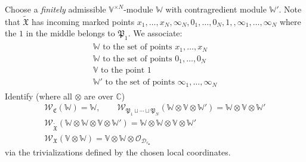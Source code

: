 \documentclass[11pt,b5paper,notitlepage]{article}
\theoremstyle{definition}
\theoremstyle{plain}
\newcommand{\fk}{\mathfrak}
\newcommand{\wtd}{\widetilde}
\newcommand{\blt}{\bullet}
\newcommand{\Vbb}{\mathbb V}
\newcommand{\Wbb}{\mathbb W}
\newcommand{\Cbb}{\mathbb C}
\newcommand{\<}{\left\langle}
\renewcommand{\>}{\right\rangle}
\newcommand{\MO}{\mathcal{O}}
\newcommand{\fx}{\mathfrak{X}}
\newcommand{\SW}{\mathscr{W}}
\newcommand{\MD}{\mathcal{D}}
\newcommand{\FC}{\mathfrak{C}}
\numberwithin{equation}{section}
\begin{document}
     
Choose a \emph{finitely} admissible $\Vbb^{\times N}$-module $\Wbb$ with contragredient module $\Wbb'$. Note that $\wtd{\fk X}$ has incoming marked points $x_1,\dots,x_N,\infty_N,0_1,\dots,0_N,1,,\infty_1,\dots,\infty_N$ where the  $1$ in the middle belongs to $\fk P_1$. We associate:
\begin{gather}
\begin{gathered}
\Wbb\text{ to the set of points }x_1,\dots,x_N\\
\Wbb\text{ to the set of points }0_1,\dots,0_N\\
\Vbb\text{ to the point }1\\
\Wbb'\text{ to the set of points }\infty_1,\dots,\infty_N
\end{gathered}
\end{gather}
Identify (where all $\otimes$ are over $\Cbb$)
    \begin{gather*}
        \SW_{\FC}(\Wbb)=\Wbb,    \qquad    \SW_{\fk P_1\sqcup\cdots\sqcup\fk P_N}(\Wbb\otimes \Vbb\otimes \Wbb')=\Wbb\otimes \Vbb\otimes \Wbb'\\
        \SW_{\wtd{\fk X}}(\Wbb\otimes\Wbb\otimes\Vbb\otimes\Wbb')=\Wbb\otimes\Wbb\otimes\Vbb\otimes\Wbb'\\
        \SW_{\fx}(\Vbb\otimes \Wbb)=\Vbb\otimes \Wbb\otimes \MO_{\MD_{r_\blt}}
    \end{gather*}
via the trivializations defined by the chosen local coordinates. 
\end{document}
